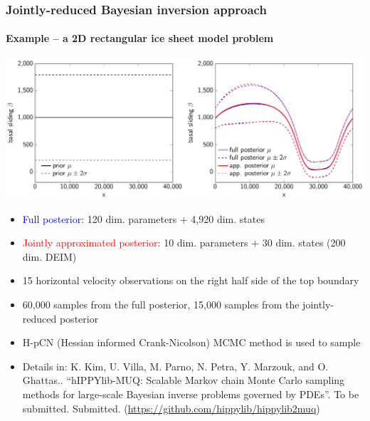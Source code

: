 \documentclass{beamer}
\begin{document}
\begin{frame}
  \frametitle{Jointly-reduced Bayesian inversion approach}
  \framesubtitle{Example -- a 2D rectangular ice sheet model problem}
  \begin{center}
    \includegraphics[width=\columnwidth]{figures/basal_estimates.pdf}
  \end{center}

  \scriptsize
  \begin{itemize}
    \item \textcolor{blue}{Full posterior}: 120 dim. parameters + 4,920 dim. states
    \item \textcolor{red}{Jointly approximated posterior}: 10 dim. parameters + 30 dim. states (200 dim. DEIM)
    \item 15 horizontal velocity observations on the right half side of the top boundary
    \item 60,000 samples from the full posterior, 15,000 samples from the jointly-reduced posterior
    \item H-pCN (Hessian informed Crank-Nicolson) MCMC method is used to sample
  \end{itemize}

  \vspace{0.2cm}

  \tiny
  \begin{itemize}
    \item[] Details in: K. Kim, U. Villa, M. Parno, N. Petra, Y. Marzouk, and
      O. Ghattas.. “hIPPYlib-MUQ: Scalable Markov chain Monte Carlo sampling
      methods for large-scale Bayesian inverse problems governed by PDEs”. To
      be submitted. Submitted. (\url{https://github.com/hippylib/hippylib2muq})

  \end{itemize}
  
\end{frame}
\end{document}
